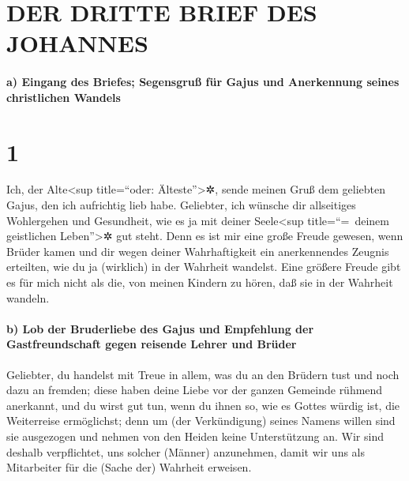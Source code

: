 \hypertarget{der-dritte-brief-des-johannes}{%
\section{DER DRITTE BRIEF DES
JOHANNES}\label{der-dritte-brief-des-johannes}}

\hypertarget{a-eingang-des-briefes-segensgruuxdf-fuxfcr-gajus-und-anerkennung-seines-christlichen-wandels}{%
\paragraph{a) Eingang des Briefes; Segensgruß für Gajus und Anerkennung
seines christlichen
Wandels}\label{a-eingang-des-briefes-segensgruuxdf-fuxfcr-gajus-und-anerkennung-seines-christlichen-wandels}}

\hypertarget{section}{%
\section{1}\label{section}}

 Ich, der Alte\textless sup title=``oder:
Älteste''\textgreater✲, sende meinen Gruß dem geliebten Gajus, den ich
aufrichtig lieb habe.  Geliebter, ich wünsche dir
allseitiges Wohlergehen und Gesundheit, wie es ja mit deiner
Seele\textless sup title=``=~deinem geistlichen Leben''\textgreater✲ gut
steht.  Denn es ist mir eine große Freude gewesen, wenn
Brüder kamen und dir wegen deiner Wahrhaftigkeit ein anerkennendes
Zeugnis erteilten, wie du ja (wirklich) in der Wahrheit wandelst.
 Eine größere Freude gibt es für mich nicht als die, von
meinen Kindern zu hören, daß sie in der Wahrheit wandeln.

\hypertarget{b-lob-der-bruderliebe-des-gajus-und-empfehlung-der-gastfreundschaft-gegen-reisende-lehrer-und-bruxfcder}{%
\paragraph{b) Lob der Bruderliebe des Gajus und Empfehlung der
Gastfreundschaft gegen reisende Lehrer und
Brüder}\label{b-lob-der-bruderliebe-des-gajus-und-empfehlung-der-gastfreundschaft-gegen-reisende-lehrer-und-bruxfcder}}

 Geliebter, du handelst mit Treue in allem, was du an den
Brüdern tust und noch dazu an fremden;  diese haben deine
Liebe vor der ganzen Gemeinde rühmend anerkannt, und du wirst gut tun,
wenn du ihnen so, wie es Gottes würdig ist, die Weiterreise ermöglichst;
 denn um (der Verkündigung) seines Namens willen sind sie
ausgezogen und nehmen von den Heiden keine Unterstützung an.
 Wir sind deshalb verpflichtet, uns solcher (Männer)
anzunehmen, damit wir uns als Mitarbeiter für die (Sache der) Wahrheit
erweisen.

